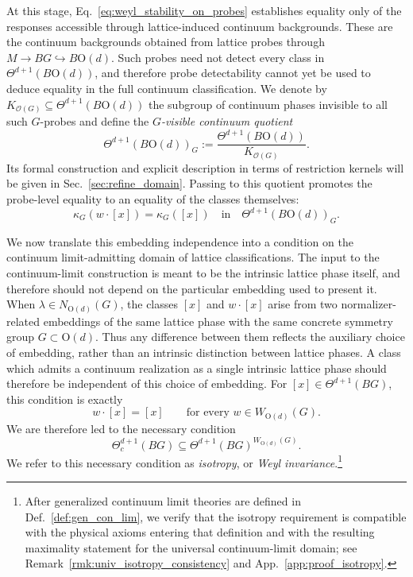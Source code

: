 \documentclass[aps,prx,reprint,superscriptaddress,twocolumn,amsmath,amssymb,amsfonts, nofootinbib]{revtex4-2}
\theoremstyle{apsstyle}
\begin{document}
At this stage, Eq.~\eqref{eq:weyl_stability_on_probes} establishes equality only of the responses accessible through lattice-induced continuum backgrounds. These are the continuum backgrounds obtained from lattice probes through $M\longrightarrow BG\hookrightarrow B\mathrm{O}(d)$. Such probes need not detect every class in $\Theta^{d+1}(B\mathrm{O}(d))$, and therefore probe detectability cannot yet be used to deduce equality in the full continuum classification. We denote by $K_{\mathcal O(G)}\subseteq\Theta^{d+1}(B\mathrm{O}(d))$ the subgroup of continuum phases invisible to all such $G$-probes and define the \emph{$G$-visible continuum quotient}
\begin{equation}
\Theta^{d+1}(B\mathrm{O}(d))_{G} := \frac{\Theta^{d+1}(B\mathrm{O}(d))}{K_{\mathcal O(G)}}.
\label{eq:G_visible_continuum_quotient}
\end{equation}
Its formal construction and explicit description in terms of restriction kernels will be given in Sec.~\ref{sec:refine_domain}. Passing to this quotient promotes the probe-level equality to an equality of the classes themselves:
\begin{equation*}
\kappa_G(w\cdot[x])= \kappa_G([x]) \quad\text{in}\quad \Theta^{d+1}(B\mathrm{O}(d))_{G}.
\end{equation*}


We now translate this embedding independence into a condition on the continuum limit-admitting domain of lattice classifications. The input to the continuum-limit construction is meant to be the intrinsic lattice phase itself, and therefore should not depend on the particular embedding used to present it. When $\lambda\in N_{\mathrm{O}(d)}(G)$, the classes $[x]$ and $w\cdot[x]$ arise from two normalizer-related embeddings of the same lattice phase with the same concrete symmetry group $G\subset \mathrm{O}(d)$. Thus any difference between them reflects the auxiliary choice of embedding, rather than an intrinsic distinction between lattice phases. A class which admits a continuum realization as a single intrinsic lattice phase should therefore be independent of this choice of embedding. For $[x]\in\Theta^{d+1}(BG)$, this condition is exactly
\begin{equation*}
w\cdot[x]=[x]
\qquad
\text{for every }w\in W_{\mathrm{O}(d)}(G).
\end{equation*}
We are therefore led to the necessary condition
\begin{equation*}
\Theta^{d+1}_c(BG)
\subseteq
\Theta^{d+1}(BG)^{W_{\mathrm{O}(d)}(G)}.
\end{equation*}
We refer to this necessary condition as \textit{isotropy}, or \textit{Weyl invariance}.\footnote{After generalized continuum limit theories are defined in Def.~\ref{def:gen_con_lim}, we verify that the isotropy requirement is compatible with the physical axioms entering that definition and with the resulting maximality statement for the universal continuum-limit domain; see Remark~\ref{rmk:univ_isotropy_consistency} and App.~\ref{app:proof_isotropy}.}
\end{document}
